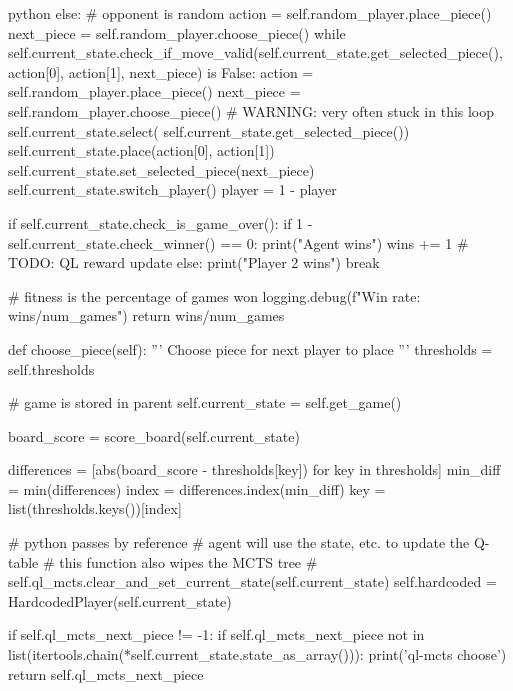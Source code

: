 \begin{mintedbox}{python}
                else:
                    # opponent is random
                    action = self.random_player.place_piece()
                    next_piece = self.random_player.choose_piece()
                    while self.current_state.check_if_move_valid(self.current_state.get_selected_piece(), action[0], action[1], next_piece) is False:
                        action = self.random_player.place_piece()
                        next_piece = self.random_player.choose_piece()
                        # WARNING: very often stuck in this loop
                    self.current_state.select(
                        self.current_state.get_selected_piece())
                    self.current_state.place(action[0], action[1])
                    self.current_state.set_selected_piece(next_piece)
                    self.current_state.switch_player()
                    player = 1 - player

                if self.current_state.check_is_game_over():
                    if 1 - self.current_state.check_winner() == 0:
                        print("Agent wins")
                        wins += 1
                        # TODO: QL reward update
                    else:
                        print("Player 2 wins")
                    break

        # fitness is the percentage of games won
        logging.debug(f"Win rate: {wins/num_games}")
        return wins/num_games

    def choose_piece(self):
        '''
        Choose piece for next player to place
        '''
        thresholds = self.thresholds

        # game is stored in parent
        self.current_state = self.get_game()

        board_score = score_board(self.current_state)

        differences = [abs(board_score - thresholds[key])
                        for key in thresholds]
        min_diff = min(differences)
        index = differences.index(min_diff)
        key = list(thresholds.keys())[index]

        # python passes by reference
        # agent will use the state, etc. to update the Q-table
        # this function also wipes the MCTS tree
        # self.ql_mcts.clear_and_set_current_state(self.current_state)
        self.hardcoded = HardcodedPlayer(self.current_state)

        if self.ql_mcts_next_piece != -1:
            if self.ql_mcts_next_piece not in list(itertools.chain(*self.current_state.state_as_array())):
                print('ql-mcts choose')
                return self.ql_mcts_next_piece


\end{mintedbox}
